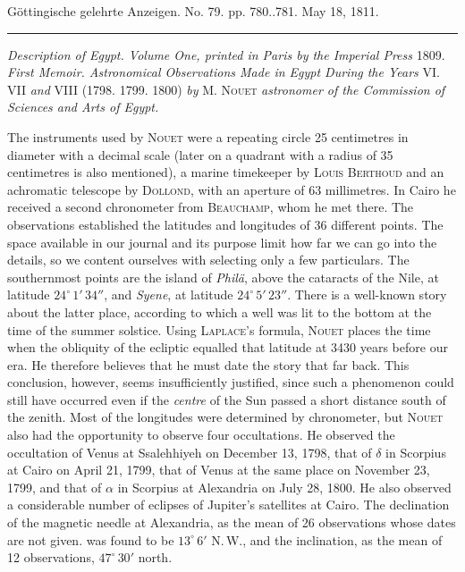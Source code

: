 \hypertarget{native-539Nouet}{}\label{native-539Nouet}
\begin{center}\small Göttingische gelehrte Anzeigen. No. 79. pp. 780..781. May 18, 1811.\\[3pt]\rule{.72\linewidth}{.3pt}\end{center}

\emph{Description of Egypt. Volume One, printed in Paris by the Imperial Press} 1809. \raisebox{-0.3ex}{,}\emph{First Memoir. Astronomical Observations Made in Egypt During the Years} VI. VII \emph{and} VIII (1798. 1799. 1800) \emph{by} M. \textsc{Nouet} \emph{astronomer of the Commission of Sciences and Arts of Egypt.}

The instruments used by \textsc{Nouet} were a repeating circle 25 centimetres in diameter with a decimal scale (later on a quadrant with a radius of 35 centimetres is also mentioned), a marine timekeeper by \textsc{Louis Berthoud} and an achromatic telescope by \textsc{Dollond}, with an aperture of 63 millimetres. In Cairo he received a second chronometer from \textsc{Beauchamp}, whom he met there. The observations established the latitudes and longitudes of 36 different points. The space available in our journal and its purpose limit how far we can go into the details, so we content ourselves with selecting only a few particulars. The southernmost points are the island of \emph{Philä}, above the cataracts of the Nile, at latitude $24^\circ\,1'\,34''$, and \emph{Syene}, at latitude $24^\circ\,5'\,23''$. There is a well-known story about the latter place, according to which a well was lit to the bottom at the time of the summer solstice. Using \textsc{Laplace}'s formula, \textsc{Nouet} places the time when the obliquity of the ecliptic equalled that latitude at 3430 years before our era. He therefore believes that he must date the story that far back. This conclusion, however, seems insufficiently justified, since such a phenomenon could still have occurred even if the \emph{centre} of the Sun passed a short distance south of the zenith. Most of the longitudes were determined by chronometer, but \textsc{Nouet} also had the opportunity to observe four occultations. He observed the occultation of Venus at Ssalehhiyeh on December 13, 1798, that of $\delta$ in Scorpius at Cairo on April 21, 1799, that of Venus at the same place on November 23, 1799, and that of $\alpha$ in Scorpius at Alexandria on July 28, 1800. He also observed a considerable number of eclipses of Jupiter's satellites at Cairo. The declination of the magnetic needle at Alexandria, as the mean of 26 observations whose dates are not given. was found to be $13^\circ\,6'$ N.\,W., and the inclination, as the mean of 12 observations, $47^\circ\,30'$ north.

